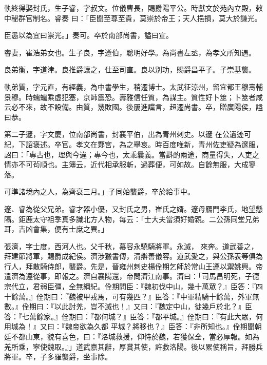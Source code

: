\begin{pinyinscope}
 軌終得娶封氏，生子睿，字叔文。位儀曹長，賜爵陽平公。時獻文於苑內立殿，敕中秘群官制名。睿奏
 曰：「臣聞至尊至貴，莫崇於帝王；天人挹損，莫大於謙光。



 臣愚以為宜曰崇光。」奏可。卒於南部尚書，謚曰宣。



 睿妻，崔浩弟女也。生子良，字遵伯，聰明好學。為尚書左丞，為孝文所知遇。



 良弟衡，字道津。良推爵讓之，仕至司直。良以別功，賜爵昌平子。子崇基襲。



 軌弟質，字元直，有經義，為中書學生，稍遷博士。太武征涼州，留宜都王穆壽輔景穆。時蠕蠕乘虛犯塞，京師震恐。壽雅信任質，為謀主。質性好卜筮；卜筮者咸云必不來，故不設備。由質，幾敗國。後屢進讜言，超遷尚書。卒，贈廣陽侯，謚曰恭。



 第二子邃，字文慶，位南部尚書，封襄平伯，出為青州刺史。以邃
 在公遺迹可紀，下詔褒述。卒官。孝文在鄴宮，為之舉哀。時百度唯新，青州佐吏疑為邃服，詔曰：「專古也，理與今違；專今也，太乖曩義。當斟酌兩途，商量得失，人吏之情亦不可茍順也。主簿云，近代相承服斬，過葬便，可如故。自餘無服，大成寥落。



 可準諸境內之人，為齊衰三月。」子同始襲爵，卒於給事中。



 邃、睿為從父兄弟。睿才器小優，又封氏之男，崔氏之婿。邃母鴈門李氏，地望懸隔。鉅鹿太守祖季真多識北方人物，每云：「士大夫當須好婚親。二公孫同堂兄弟耳，吉凶會集，便有士庶之異。」



 張濟，字士度，西河人也。父千秋，慕容永驍騎將軍。永滅，
 來奔。道武善之，拜建節將軍，賜爵成紀侯。濟涉獵書傳，清辯善儀容。道武愛之，與公孫表等俱為行人，拜散騎侍郎，襲爵。先是，晉雍州刺史楊佺期乞師於常山王遵以禦姚興。帝遣濟為遵從事，即報之。濟自襄陽還，帝問濟江南事。濟曰：「司馬昌明死，子德宗代立，君弱臣彊，全無綱紀。佺期問臣：『魏初伐中山，幾十萬眾？』臣答：『四十餘萬。』佺期曰：『魏被甲戎馬，可有幾匹？』臣答：『中軍精騎十餘萬，外軍無數。』佺期曰：『以此討羌，豈不滅也！』又曰：『魏定中山，徙幾戶於北？』臣答：『七萬餘家。』佺期曰：『都何城？』臣答：『都平城。』佺期曰：『有此大眾，何用城為！』又曰：『魏帝欲為久都
 平城？將移也？』臣答：『非所知也。』佺期聞朝廷不都山東，貌有喜色，曰：『洛城救援，仰恃於魏，若獲保全，當必厚報。如為羌所乘，寧使魏取。』」道武嘉其辭，厚賞其使，許救洛陽。後以累使稱旨，拜勝兵將軍。卒，子多羅襲爵，坐事除。




\end{pinyinscope}
